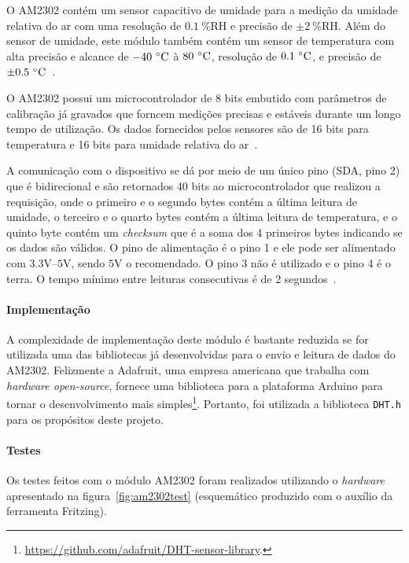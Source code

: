 		O AM2302 contém um sensor capacitivo de umidade para a medição da umidade relativa
		do ar com uma resolução de $0.1~\%\textrm{RH}$ e precisão de $\pm 2~\%\textrm{RH}$.
		Além do sensor de umidade, este módulo também contém um sensor de temperatura com
		alta precisão e alcance de $-40~\celsius$ à $80~\celsius$, resolução de $0.1~\celsius$,
		e precisão de $\pm 0.5~\celsius$~\cite{aosong}.

		O AM2302 possui um microcontrolador de 8 bits embutido com parâmetros de calibração já gravados
		que forncem medições precisas e estáveis durante um longo tempo de utilização.
		Os dados fornecidos pelos sensores são de 16 bits para temperatura e
		16 bits para umidade relativa do ar~\cite{aosong}.

		A comunicação com o dispositivo se dá por meio de um único pino (SDA, pino 2) que é
		bidirecional e são retornados 40 bits ao microcontrolador que realizou a requisição, onde
		o primeiro e o segundo bytes contém a última leitura de umidade,
		o terceiro e o quarto bytes contém a última leitura de temperatura,
		e o quinto byte contém um \textit{checksum} que é a soma dos 4 primeiros bytes
		indicando se os dados são válidos.
		O pino de alimentação é o pino 1 e ele pode ser alimentado com $3.3\textrm{V}$--$5\textrm{V}$,
		sendo $5\textrm{V}$ o recomendado. O pino 3 não é utilizado e o pino 4 é o terra.
		O tempo mínimo entre leituras consecutivas é de 2 segundos~\cite{aosong}.

	\paragraph{Implementação}

		A complexidade de implementação deste módulo é bastante reduzida
		se for utilizada uma das bibliotecas já desenvolvidas para o envio
		e leitura de dados do AM2302. Felizmente a Adafruit, uma empresa americana
		que trabalha com \textit{hardware open-source}, fornece uma biblioteca para
		a plataforma Arduino para tornar o desenvolvimento mais simples\footnote{\url{https://github.com/adafruit/DHT-sensor-library}.}.
		Portanto, foi utilizada a biblioteca \texttt{DHT.h} para os propósitos
		deste projeto.

	\paragraph{Testes}

		Os testes feitos com o módulo AM2302 foram realizados utilizando
		o \textit{hardware} apresentado na figura~\ref{fig:am2302test} (esquemático
		produzido com o auxílio da ferramenta Fritzing).

